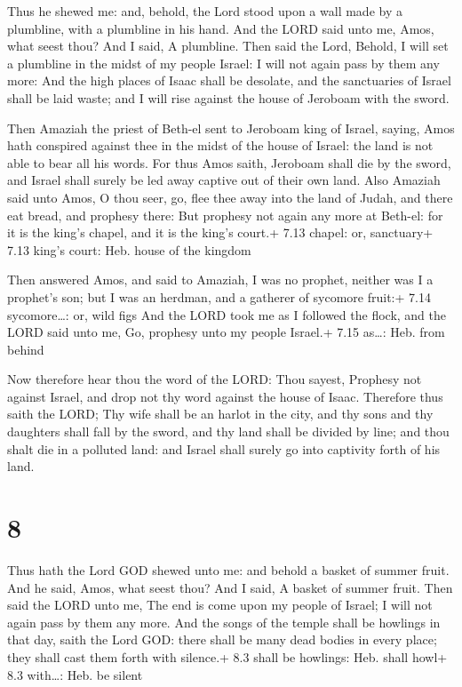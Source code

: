  Thus he shewed me: and, behold, the Lord stood upon a
wall made by a plumbline, with a plumbline in his hand.  And
the LORD said unto me, Amos, what seest thou? And I said, A plumbline.
Then said the Lord, Behold, I will set a plumbline in the midst of my
people Israel: I will not again pass by them any more:  And
the high places of Isaac shall be desolate, and the sanctuaries of
Israel shall be laid waste; and I will rise against the house of
Jeroboam with the sword.

 Then Amaziah the priest of Beth-el sent to Jeroboam king
of Israel, saying, Amos hath conspired against thee in the midst of the
house of Israel: the land is not able to bear all his words.
 For thus Amos saith, Jeroboam shall die by the sword, and
Israel shall surely be led away captive out of their own land.
 Also Amaziah said unto Amos, O thou seer, go, flee thee
away into the land of Judah, and there eat bread, and prophesy there:
 But prophesy not again any more at Beth-el: for it is the
king's chapel, and it is the king's court.+ 7.13 chapel: or, sanctuary+
7.13 king's court: Heb. house of the kingdom

 Then answered Amos, and said to Amaziah, I was no
prophet, neither was I a prophet's son; but I was an herdman, and a
gatherer of sycomore fruit:+ 7.14 sycomore\ldots: or, wild figs
 And the LORD took me as I followed the flock, and the LORD
said unto me, Go, prophesy unto my people Israel.+ 7.15 as\ldots: Heb.
from behind

 Now therefore hear thou the word of the LORD: Thou
sayest, Prophesy not against Israel, and drop not thy word against the
house of Isaac.  Therefore thus saith the LORD; Thy wife
shall be an harlot in the city, and thy sons and thy daughters shall
fall by the sword, and thy land shall be divided by line; and thou shalt
die in a polluted land: and Israel shall surely go into captivity forth
of his land.

\hypertarget{section-7}{%
\section{8}\label{section-7}}

 Thus hath the Lord GOD shewed unto me: and behold a basket
of summer fruit.  And he said, Amos, what seest thou? And I
said, A basket of summer fruit. Then said the LORD unto me, The end is
come upon my people of Israel; I will not again pass by them any more.
 And the songs of the temple shall be howlings in that day,
saith the Lord GOD: there shall be many dead bodies in every place; they
shall cast them forth with silence.+ 8.3 shall be howlings: Heb. shall
howl+ 8.3 with\ldots: Heb. be silent

